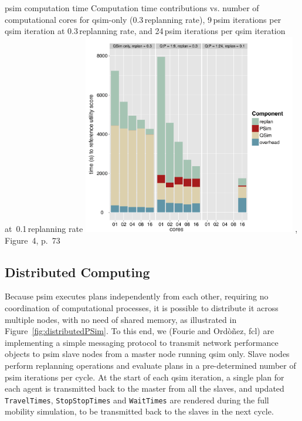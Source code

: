 \createfigure%
{\protect\gls{psim} computation time}%
{Computation time contributions vs. number of computational cores for \protect\gls{qsim}-only (0.3\,replanning rate), 9\,\gls{psim} iterations per \gls{qsim} iteration at 0.3\,replanning rate, and 24\,\gls{psim} iterations per \protect\gls{qsim} iteration at~0.1\,replanning rate}%
{\label{fig:PSimPerformance}}%
{\includegraphics[width=0.7\textwidth, angle=0]{extending/figures/PSim/times}}%
{\citet[][]{FourieEtAl_TRR_2013}, Figure~4, p.~73}

\subsection{Distributed Computing}
Because \gls{psim} executes plans independently from each other, requiring no coordination of computational processes, it is possible to distribute it across multiple nodes, with no need of shared memory, as illustrated in Figure~\ref{fig:distributedPSim}. To this end, we (Fourie and Ord\`o\~nez, \gls{fcl}) are implementing a simple messaging protocol to transmit network performance objects to \gls{psim} slave nodes from a master node running \gls{qsim} only. Slave nodes perform replanning operations and evaluate plans in a pre-determined number of \gls{psim} iterations per cycle. At the start of each \gls{qsim} iteration, a single plan for each agent is transmitted back to the master from all the slaves, and updated \lstinline|TravelTimes|, \lstinline|StopStopTimes| and \lstinline|WaitTimes| are rendered during the full mobility simulation, to be transmitted back to the slaves in the next cycle.

